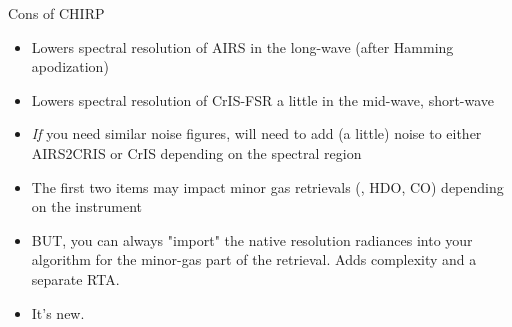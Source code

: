 \documentclass[10pt,t]{beamer}
\begin{document}
\begin{frame}[label={sec:org7d36ac3}]{Cons of CHIRP}
\begin{itemize}
\item Lowers spectral resolution of AIRS in the long-wave (after Hamming apodization)
\item Lowers spectral resolution of CrIS-FSR a little in the mid-wave, short-wave
\item \emph{If} you need similar noise figures, will need to add (a little) noise to either AIRS2CRIS or CrIS depending on the spectral region
\item The first two items may impact minor gas retrievals (\methane, HDO, CO) depending on the instrument
\item BUT, you can always "import" the native resolution radiances into your algorithm for the minor-gas part of the retrieval.  Adds complexity and a separate RTA.
\item It's new.
\end{itemize}
\end{frame}
\end{document}
